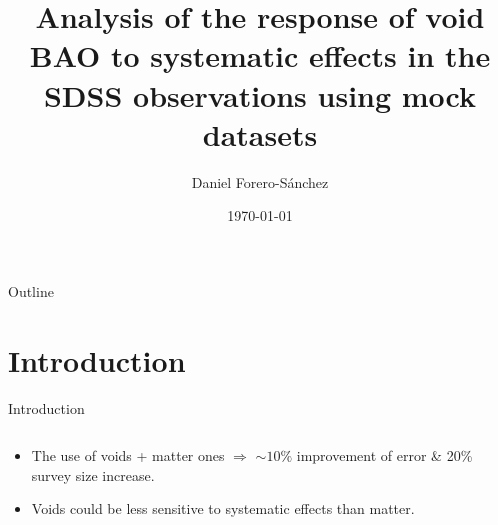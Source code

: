\documentclass{beamer}
\title[Effects of systematics on void BAO]{Analysis of the response of void BAO to systematic effects in the SDSS observations using mock datasets}
\author{Daniel Forero-S\'anchez\inst{\dag}}
\institute[EPFL] %
{
  \inst{\dag}%
  Laboratory of Astrophysics (LASTRO)\\
  \vspace{5mm}
  École Polytechnyque Fédérale de Lausanne (EPFL)\\
  Lausanne, Suisse
  
  }
\date{\today}
\begin{document}
\begin{frame}
  \titlepage
\end{frame}

\begin{frame}[allowframebreaks]{Outline}
	\begin{multicols}{2}
		\tableofcontents
	\end{multicols}

\end{frame}
\section{Introduction}


\begin{frame}[allowframebreaks]{Introduction}
	\begin{columns}
		\begin{column}{0.55\linewidth}
				\begin{itemize}
					\item The use of voids + matter ones $\Rightarrow$ $\sim10\%$ improvement of error \& 20\% survey size increase.
					\item Voids could be less sensitive to systematic effects than matter.
				\end{itemize}

		\end{column}
		\end{columns}
\end{frame}
\end{document}
